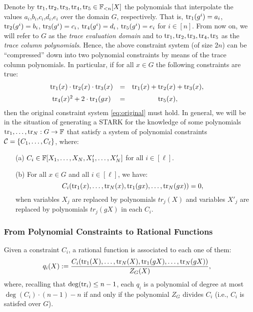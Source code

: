 Denote by $\text{tr}_1,\text{tr}_2,\text{tr}_3,\text{tr}_4,\text{tr}_5 \in \mathbb{F}_{<n}[X]$ the polynomials that interpolate the values $a_i$,$b_i$,$c_i$,$d_i$,$e_i$ over the domain $G$, respectively. That is, $\text{tr}_1(g^i) = a_i$, $\text{tr}_2(g^i) = b_i$, $\text{tr}_3(g^i) = c_i$, $\text{tr}_4(g^i) = d_i$, $\text{tr}_5(g^i) = e_i$ for $i \in [n]$. From now on, we will refer to $G$ as the \textit{trace evaluation domain} and to $\text{tr}_1,\text{tr}_2,\text{tr}_3,\text{tr}_4,\text{tr}_5$ as the \textit{trace column polynomials}.
Hence, the above constraint system (of size $2n$) can be ``compressed'' down into two polynomial constraints by means of the trace column polynomials. In particular, if for all $x \in G$ the following constraints are true:
\begin{align}\label{eq:constraints}
\begin{array}{ccc}
\text{tr}_1(x) \cdot \text{tr}_2(x) \cdot \text{tr}_3(x) & = & \text{tr}_1(x) + \text{tr}_2(x) + \text{tr}_3(x), \\[0.2cm]
\text{tr}_4(x)^2 + 2 \cdot \text{tr}_1(gx) & = & \text{tr}_5(x),
\end{array}
\end{align}
then the original constraint system \eqref{eq:original} must hold.
In general, we will be in the situation of generating a STARK for the knowledge of some polynomials $\text{tr}_1, \dots, \text{tr}_N: G \to \mathbb{F}$ that satisfy a system of polynomial constraints $\mathcal{C} = \{C_1, \dots, C_\ell \}$, where:
\begin{enumerate}
  \item[(a)] $C_i \in \mathbb{F}[X_1, \dots, X_N, X'_1, \dots, X'_N]$ for all $i \in [\ell]$.
  \item[(b)] For all $x \in G$ and all $i \in [\ell]$, we have:
  \begin{equation}\label{eq:generic-constraints}
  C_i(\text{tr}_1(x), \dots, \text{tr}_N(x), \text{tr}_1(gx), \dots, \text{tr}_N(gx)) = 0,
  \end{equation}
  when variables $X_j$ are replaced by polynomials $tr_j(X)$ and variables $X'_j$ are replaced by polynomials $tr_j(gX)$ in each $C_i$.
\end{enumerate}


\subsubsection*{From Polynomial Constraints to Rational Functions}\label{sec:constraint-rational}

Given a constraint $C_i$, a rational function is associated to each one of them:
\begin{equation}\label{eq:rational-function}
q_i(X) := \frac{C_i(\text{tr}_1(X), \dots, \text{tr}_N(X), \text{tr}_1(gX), \dots, \text{tr}_N(gX))}{Z_G(X)},
\end{equation}
where, recalling that $\deg(\text{tr}_i) \leq n-1$, each $q_i$ is a polynomial of degree at most $\deg(C_i) \cdot (n - 1) - n$ if and only if the polynomial $Z_G$ divides $C_i$ (i.e., $C_i$ is satisfed over $G$).


